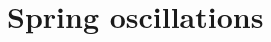 \documentclass[preview]{standalone}
\begin{document}
\genpage

\section{Spring oscillations}
\end{document}
